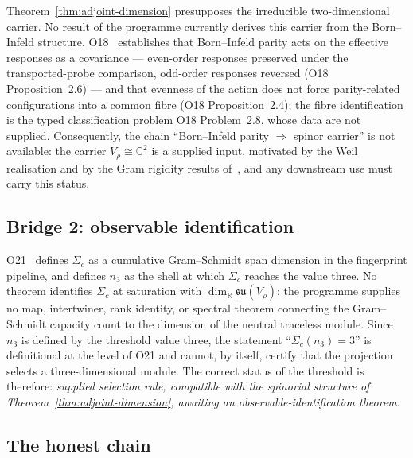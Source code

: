 \documentclass[11pt,a4paper]{article}
\newcommand{\su}{\mathfrak{su}}
\begin{document}
    Theorem~\ref{thm:adjoint-dimension} presupposes the irreducible two-dimensional
    carrier.
    No result of the programme currently derives this carrier from the Born--Infeld
    structure.
    O18~\cite{Beau2026a22} establishes that Born--Infeld parity acts on the effective
    responses as a covariance --- even-order responses preserved under the transported-probe
    comparison, odd-order responses reversed (O18 Proposition~2.6) --- and that evenness of
    the action does not force parity-related configurations into a common fibre
    (O18 Proposition~2.4);
    the fibre identification is the typed classification problem O18 Problem~2.8, whose
    data are not supplied.
    Consequently, the chain ``Born--Infeld parity $\Rightarrow$ spinor carrier'' is not
    available: the carrier $V_{\rho} \cong \mathbb{C}^{2}$ is a supplied input, motivated
    by the Weil realisation and by the Gram rigidity results of~\cite{Beau2026a3}, and any
    downstream use must carry this status.

  \subsection{Bridge 2: observable identification}
    \label{ssec:sigma-bridge}

    O21~\cite{Beau2026a25} defines $\Sigma_{c}$ as a cumulative Gram--Schmidt span
    dimension in the fingerprint pipeline, and defines $n_{3}$ as the shell at which
    $\Sigma_{c}$ reaches the value three.
    No theorem identifies $\Sigma_{c}$ at saturation with
    $\dim_{\mathbb{R}} \su(V_{\rho})$: the programme supplies no map, intertwiner, rank
    identity, or spectral theorem connecting the Gram--Schmidt capacity count to the
    dimension of the neutral traceless module.
    Since $n_{3}$ is defined by the threshold value three, the statement
    ``$\Sigma_{c}(n_{3}) = 3$'' is definitional at the level of O21 and cannot, by
    itself, certify that the projection selects a three-dimensional module.
    The correct status of the threshold is therefore: \emph{supplied selection rule,
    compatible with the spinorial structure of Theorem~\ref{thm:adjoint-dimension},
    awaiting an observable-identification theorem}.

  \subsection{The honest chain}
    \label{ssec:honest-chain}
\end{document}
